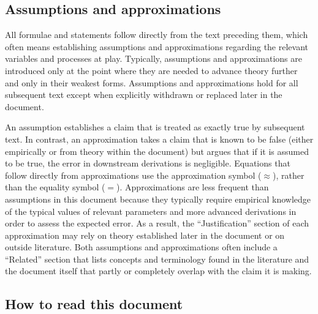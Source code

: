 \documentclass[12pt]{article}
\numberwithin{equation}{section}
\begin{document}
\subsection{Assumptions and approximations}

All formulae and statements follow directly from the text preceding them, which often means establishing assumptions and approximations regarding the relevant variables and processes at play.
Typically, assumptions and approximations are introduced only at the point where they are needed to advance theory further and only in their weakest forms.
Assumptions and approximations hold for all subsequent text except when explicitly withdrawn or replaced later in the document.

An assumption establishes a claim that is treated as exactly true by subsequent text.
In contrast, an approximation takes a claim that is known to be false (either empirically or from theory within the document) but argues that if it is assumed to be true, the error in downstream derivations is negligible.
Equations that follow directly from approximations use the approximation symbol ($\approx$), rather than the equality symbol ($=$).
Approximations are less frequent than assumptions in this document because they typically require empirical knowledge of the typical values of relevant parameters and more advanced derivations in order to assess the expected error.
As a result, the ``Justification'' section of each approximation may rely on theory established later in the document or on outside literature.
Both assumptions and approximations often include a ``Related'' section that lists concepts and terminology found in the literature and the document itself that partly or completely overlap with the claim it is making.

\subsection{How to read this document}
\end{document}
